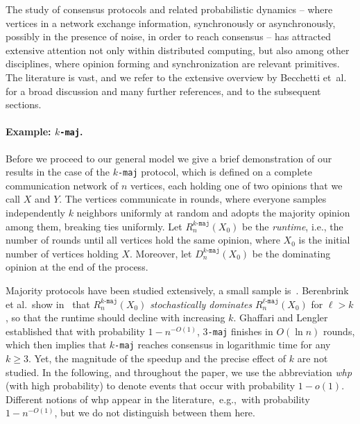 \documentclass[11pt]{article}
\numberwithin{theorem}{section}
\begin{document}
The study of consensus protocols and related probabilistic dynamics -- where vertices in a network exchange information, synchronously or asynchronously, possibly in the presence of noise, in order to reach consensus -- has attracted extensive attention not only within distributed computing, but also among other disciplines, where opinion forming and synchronization are relevant primitives. The literature is vast, and we refer to the extensive overview by Becchetti et~al.~\cite{consensusprotoverview} for a broad discussion and many further references, and to the subsequent sections. 

\paragraph{Example: \texttt{$k$-maj}.} Before we proceed to our general model we give a brief demonstration of our results in the case of the \texttt{$k$-maj} protocol, which is defined on a complete communication network of $n$ vertices, each holding one of two opinions that we call $X$ and $Y$. The vertices communicate in rounds, where everyone samples independently $k$ neighbors uniformly at random and adopts the majority opinion among them, breaking ties uniformly. Let $R_n^{\texttt{$k$-maj}}(X_0)$ be the \emph{runtime}, i.e., the number of rounds until all vertices hold the same opinion, where $X_0$ is the initial number of vertices holding $X$. Moreover, let $D_n^{\texttt{$k$-maj}}(X_0)$ be the dominating opinion at the end of the process.

Majority protocols have been studied extensively, a small sample is~\cite{becchettilowerbound,Becchetti2016Stabilizing, hierarchyconj}. Berenbrink et al.~show in~\cite{inp:bcghkr23} that $R_n^{\texttt{$k$-maj}}(X_0)$ \emph{stochastically dominates} $R_n^{\texttt{$\ell$-maj}}(X_0)$ for $\ell > k$, so that the runtime should decline with increasing $k$.
Ghaffari and Lengler \cite{GhaffariLengler} established that with probability $1-n^{-O(1)}$, \texttt{$3$-maj} finishes in $O(\ln n)$ rounds, which then implies that \texttt{$k$-maj} reaches consensus in logarithmic time for any $k\geq 3$.
Yet, the magnitude of the speedup and the precise effect of $k$ are not studied. 
In the following, and throughout the paper, we use the abbreviation \emph{whp} (with high probability) to denote events that occur with probability $1-o(1)$. Different notions of whp appear in the literature,~e.g.,~with probability $1-n^{-O(1)}$, but we do not distinguish between them here. 
\end{document}
